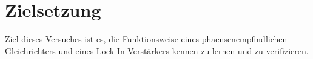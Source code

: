 \section{Zielsetzung}
\label{sec:Zielsetzung}
Ziel dieses Versuches ist es, die Funktionsweise eines phaensenempfindlichen
Gleichrichters und eines Lock-In-Verstärkers kennen zu lernen und zu verifizieren.
